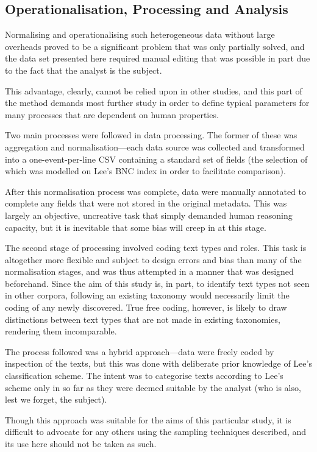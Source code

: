 \subsection{Operationalisation, Processing and Analysis}
\label{sec:personal:method:operationalisation}
Normalising and operationalising such heterogeneous data without large overheads proved to be a significant problem that was only partially solved, and the data set presented here required manual editing that was possible in part due to the fact that the analyst is the subject.

This advantage, clearly, cannot be relied upon in other studies, and this part of the method demands most further study in order to define typical parameters for many processes that are dependent on human properties.

Two main processes were followed in data processing.  The former of these was aggregation and normalisation---each data source was collected and transformed into a one-event-per-line CSV containing a standard set of fields (the selection of which was modelled on Lee's BNC index\cite{lee2001genres} in order to facilitate comparison).

After this normalisation process was complete, data were manually annotated to complete any fields that were not stored in the original metadata.  This was largely an objective, uncreative task that simply demanded human reasoning capacity, but it is inevitable that some bias will creep in at this stage.

The second stage of processing involved coding text types and roles.  This task is altogether more flexible and subject to design errors and bias than many of the normalisation stages, and was thus attempted in a manner that was designed beforehand.  Since the aim of this study is, in part, to identify text types not seen in other corpora, following an existing taxonomy would necessarily limit the coding of any newly discovered.  True free coding, however, is likely to draw distinctions between text types that are not made in existing taxonomies, rendering them incomparable.

The process followed was a hybrid approach---data were freely coded by inspection of the texts, but this was done with deliberate prior knowledge of Lee's classification scheme.  The intent was to categorise texts according to Lee's scheme only in so far as they were deemed suitable by the analyst (who is also, lest we forget, the subject).

Though this approach was suitable for the aims of this particular study, it is difficult to advocate for any others using the sampling techniques described, and its use here should not be taken as such.

